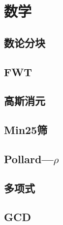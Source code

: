 \section{数学}

\subsection{数论分块}


\subsection{FWT}


\subsection{高斯消元}


\subsection{Min25筛}


\subsection{Pollard—$\rho$}


\subsection{多项式}


\subsection{GCD}

